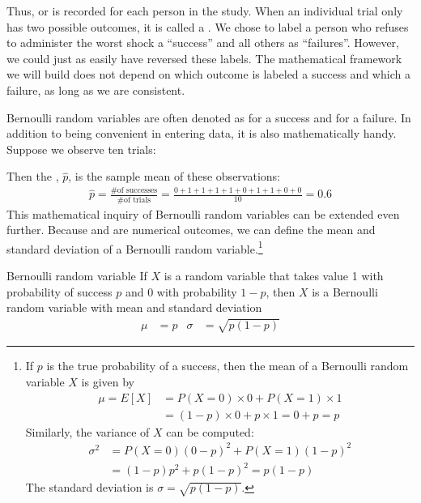 Thus,  or  is recorded for
each person in the study.
When an individual trial only has two possible outcomes,
it is called a
.
We chose to label a person who refuses to administer the
worst shock a ``success'' and all others as ``failures''.
However, we could just as easily have reversed these labels.
The mathematical framework we will build does not depend
on which outcome is labeled a success and which a failure,
as long as we are consistent.

Bernoulli random variables are often denoted as 
for a success and  for a failure.
In addition to being convenient in entering data,
it is also mathematically handy.
Suppose we observe ten trials:
\begin{center}
         
\end{center}
Then the , $\hat{p}$, is the
sample mean of these observations:
\begin{align*}
\hat{p} = \frac{\text{\# of successes}}{\text{\# of trials}}
    = \frac{0+1+1+1+1+0+1+1+0+0}{10} = 0.6
\end{align*}%
This mathematical inquiry of Bernoulli random variables can
be extended even further.
Because  and  are numerical outcomes,
we can define the {mean} and {standard deviation}
of a Bernoulli random variable.\footnote{If ${p}$ is the true probability of a success, then the mean of a Bernoulli random variable $X$ is given by
\begin{align*}
\mu = E[X] &= P(X = 0) \times 0 + P(X = 1) \times 1 \\
	&= (1 - p) \times 0 + p\times 1 = 0 + p = p
\end{align*}
Similarly, the variance of $X$ can be computed:
\begin{align*}
\sigma^2 &= {P(X=0)(0-p)^2 + P(X=1)(1-p)^2} \\
	&= {(1-p)p^2 + p(1-p)^2} = {p(1-p)}
\end{align*}
The standard deviation is $\sigma=\sqrt{p(1-p)}$.}

\begin{onebox}{Bernoulli random variable}
  If $X$ is a random variable that takes value 1 with
  probability of success $p$ and 0 with probability $1-p$,
  then $X$ is a Bernoulli random variable with mean
  and standard deviation
  \begin{align*}
  \mu &= p
      &\sigma&= \sqrt{p(1-p)}
  \end{align*}
\end{onebox}

